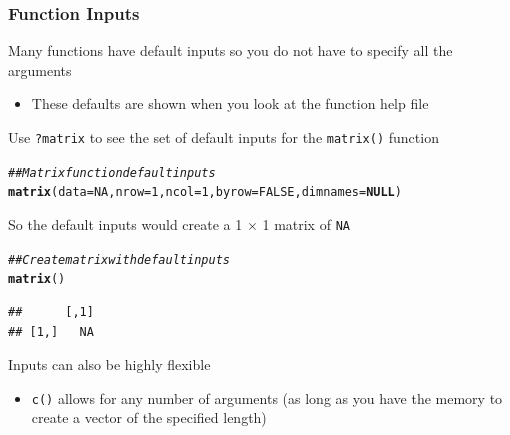 \documentclass{beamer}\usepackage[]{graphicx}\usepackage[]{color}
\makeatletter
\newcommand{\hlnum}[1]{\textcolor[rgb]{0.686,0.059,0.569}{#1}}%
\newcommand{\hlcom}[1]{\textcolor[rgb]{0.678,0.584,0.686}{\textit{#1}}}%
\newcommand{\hlstd}[1]{\textcolor[rgb]{0.345,0.345,0.345}{#1}}%
\newcommand{\hlkwa}[1]{\textcolor[rgb]{0.161,0.373,0.58}{\textbf{#1}}}%
\newcommand{\hlkwc}[1]{\textcolor[rgb]{0.333,0.667,0.333}{#1}}%
\newcommand{\hlkwd}[1]{\textcolor[rgb]{0.737,0.353,0.396}{\textbf{#1}}}%
\newenvironment{kframe}{%
 \def\at@end@of@kframe{}%
 \ifinner\ifhmode%
  \def\at@end@of@kframe{\end{minipage}}%
  \begin{minipage}{\columnwidth}%
 \fi\fi%
 \def\FrameCommand##1{\hskip\@totalleftmargin \hskip-\fboxsep
 \colorbox{shadecolor}{##1}\hskip-\fboxsep
     \hskip-\linewidth \hskip-\@totalleftmargin \hskip\columnwidth}%
 \MakeFramed {\advance\hsize-\width
   \@totalleftmargin\z@ \linewidth\hsize
   \@setminipage}}%
 {\par\unskip\endMakeFramed%
 \at@end@of@kframe}
\newenvironment{knitrout}{}{} %
\makeatother
\begin{document}
\begin{frame}[fragile]\frametitle{Function Inputs}
    Many functions have default inputs so you do not have to specify all the arguments
    \begin{itemize}
        \item These defaults are shown when you look at the function help file
    \end{itemize}
    \vspace{2ex}
    Use \texttt{?matrix} to see the set of default inputs for the \texttt{matrix()} function
\begin{knitrout}\footnotesize
{}\color{fgcolor}\begin{kframe}
\begin{alltt}
\hlcom{## Matrix function default inputs}
\hlkwd{matrix}\hlstd{(}\hlkwc{data} \hlstd{=} \hlnum{NA}\hlstd{,} \hlkwc{nrow} \hlstd{=} \hlnum{1}\hlstd{,} \hlkwc{ncol} \hlstd{=} \hlnum{1}\hlstd{,} \hlkwc{byrow} \hlstd{=} \hlnum{FALSE}\hlstd{,} \hlkwc{dimnames} \hlstd{=} \hlkwa{NULL}\hlstd{)}
\end{alltt}
\end{kframe}
\end{knitrout}
    \vspace{2ex}
    So the default inputs would create a 1 $\times$ 1 matrix of \texttt{NA}
\begin{knitrout}\footnotesize
{}\color{fgcolor}\begin{kframe}
\begin{alltt}
\hlcom{## Create matrix with default inputs}
\hlkwd{matrix}\hlstd{()}
\end{alltt}
\begin{verbatim}
##      [,1]
## [1,]   NA
\end{verbatim}
\end{kframe}
\end{knitrout}
    \vspace{2ex}
    Inputs can also be highly flexible
    \begin{itemize}
        \item \texttt{c()} allows for any number of arguments (as long as you have the memory to create a vector of the specified length)
    \end{itemize}
\end{frame}
\end{document}
